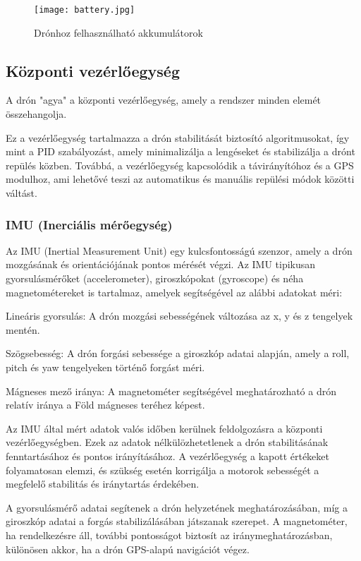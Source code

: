 \begin{figure}[H]
	\centering
	\texttt{[image: battery.jpg]}
	\caption{Drónhoz felhasználható akkumulátorok}
	\label{Drónhoz felhasznált ESC-kDrónhoz felhasználható akkumulátorok}
\end{figure}

\subsection{Központi vezérlőegység}
A drón "agya" a központi vezérlőegység, amely a rendszer minden elemét összehangolja. 

Ez a vezérlőegység tartalmazza a drón stabilitását biztosító algoritmusokat, így mint a PID szabályozást, amely minimalizálja a lengéseket és stabilizálja a drónt repülés közben. Továbbá, a vezérlőegység kapcsolódik a távirányítóhoz és a GPS modulhoz, ami lehetővé teszi az automatikus és manuális repülési módok közötti váltást.

\subsubsection{IMU (Inerciális mérőegység)}
Az IMU (Inertial Measurement Unit) egy kulcsfontosságú szenzor, amely a drón mozgásának és orientációjának pontos mérését végzi. Az IMU tipikusan gyorsulásmérőket (accelerometer), giroszkópokat (gyroscope) és néha magnetométereket is tartalmaz, amelyek segítségével az alábbi adatokat méri:

Lineáris gyorsulás: A drón mozgási sebességének változása az x, y és z tengelyek mentén.

Szögsebesség: A drón forgási sebessége a giroszkóp adatai alapján, amely a roll, pitch és yaw tengelyeken történő forgást méri.

Mágneses mező iránya: A magnetométer segítségével meghatározható a drón relatív iránya a Föld mágneses teréhez képest.

Az IMU által mért adatok valós időben kerülnek feldolgozásra a központi vezérlőegységben. Ezek az adatok nélkülözhetetlenek a drón stabilitásának fenntartásához és pontos irányításához. A vezérlőegység a kapott értékeket folyamatosan elemzi, és szükség esetén korrigálja a motorok sebességét a megfelelő stabilitás és iránytartás érdekében.

A gyorsulásmérő adatai segítenek a drón helyzetének meghatározásában, míg a giroszkóp adatai a forgás stabilizálásában játszanak szerepet. A magnetométer, ha rendelkezésre áll, további pontosságot biztosít az iránymeghatározásban, különösen akkor, ha a drón GPS-alapú navigációt végez.

